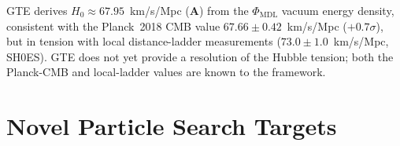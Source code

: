 \documentclass[11pt,openany]{book}
\theoremstyle{remark}
\newcommand{\PHIMDL}{\Phi_{\mathrm{MDL}}}
\newcommand{\CatA}{\textbf{A}}
\begin{document}
\begin{appendices}
\begin{description}[leftmargin=*,itemsep=4pt]
\item[$H_0$ Hubble constant ($67.95$ vs.\ $73.0$~km/s/Mpc).]
GTE derives $H_0\approx67.95$~km/s/Mpc (\CatA) from the $\PHIMDL$ vacuum
energy density, consistent with the Planck~2018 CMB value $67.66\pm0.42$~km/s/Mpc
($+0.7\sigma$), but in tension with local distance-ladder measurements
($73.0\pm1.0$~km/s/Mpc, SH0ES).
GTE does not yet provide a resolution of the Hubble tension; both the
Planck-CMB and local-ladder values are known to the framework.

\end{description}

\section*{Novel Particle Search Targets}
\label{app:particle_search}



\end{appendices}



\end{document}
